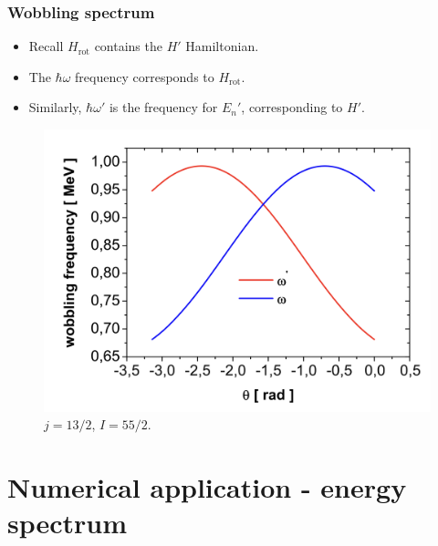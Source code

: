 \documentclass{beamer}
\begin{document}
\begin{frame}
  \frametitle{Wobbling spectrum}
  \begin{itemize}
    \item Recall $H_\text{rot}$ contains the $H'$ Hamiltonian.
    \item The $\hbar\omega$ frequency corresponds to $H_\text{rot}$.
    \item Similarly, $\hbar\omega'$ is the frequency for $E_n'$, corresponding to $H'$.
  \end{itemize}
\begin{figure}
  \includegraphics[scale=0.18]{figures/wobbling-frequencies.png}
  \caption{$j=13/2$, $I=55/2$.}
\end{figure}
\end{frame}

\section{Numerical application - energy spectrum}
\end{document}
